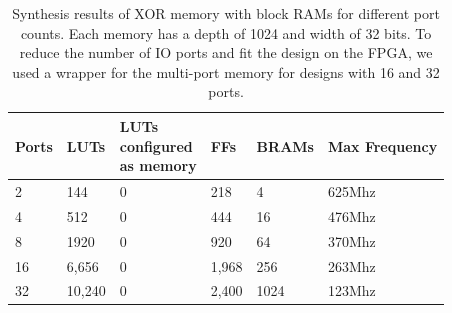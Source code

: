 \documentclass[sigconf,nonacm]{acmart}
\begin{document}
\begin{table}
  \caption{Synthesis results of XOR memory with block RAMs for different port counts. Each memory has a depth of 1024 and width of 32 bits. To reduce the number of IO ports and fit the design on the FPGA, we used a wrapper for the multi-port memory for designs with 16 and 32 ports.}
  \label{tab:syn_xor_bram_ports}
  \begin{tabular}{llllll}
    \toprule
    Ports & LUTs & \thead{LUTs\\ configured\\ as memory} & FFs & BRAMs & Max Frequency\\
    \midrule
    2 & 144 & 0 & 218 & 4 & 625Mhz\\
    4 & 512 & 0 & 444 & 16 & 476Mhz\\
    8 & 1920 & 0 & 920 & 64 & 370Mhz\\
    16 & 6,656 & 0 & 1,968 & 256 & 263Mhz\\
    32 & 10,240 & 0 & 2,400 & 1024 & 123Mhz\\
    \bottomrule
  \end{tabular}
\end{table}
\end{document}
